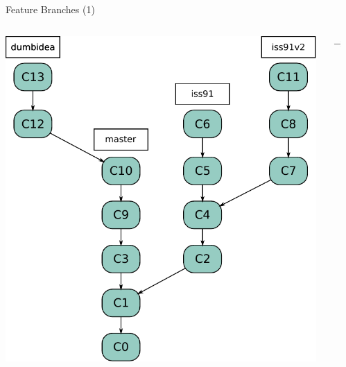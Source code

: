 \begin{frame}{Feature Branches (1)}
\begin{columns}[T]
  \begin{column}{.45\textwidth}
    \begin{block}{}
      \includegraphics[scale=0.4]{images/feature-branches1.pdf}
    \end{block}
  \end{column}
  \begin{column}{.1\textwidth}
    \begin{block}{}
      \pause $\longrightarrow$
    \end{block}
  \end{column}
  \begin{column}{.45\textwidth}
    \begin{block}{}  

\end{block}
\end{column}
\end{columns}
\end{frame}
